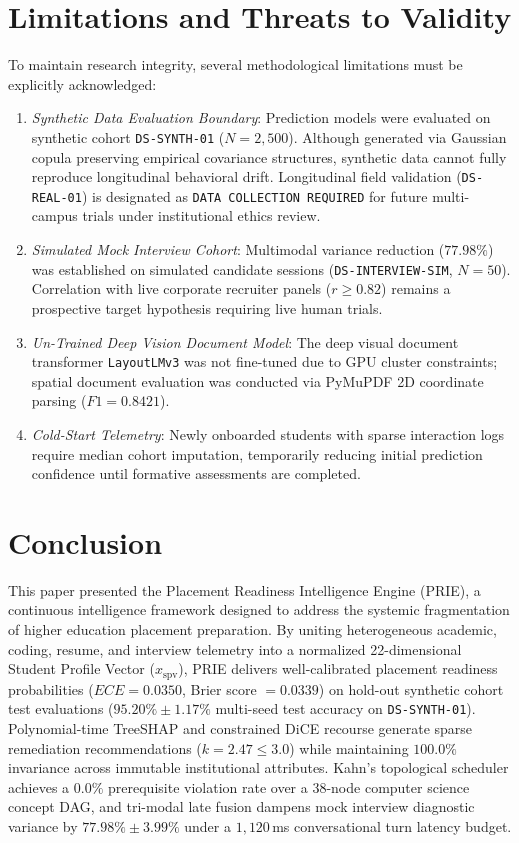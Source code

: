 \documentclass[conference]{IEEEtran}
\begin{document}
\section{Limitations and Threats to Validity}

To maintain research integrity, several methodological limitations must be explicitly acknowledged:
\begin{enumerate}
\item \textit{Synthetic Data Evaluation Boundary}: Prediction models were evaluated on synthetic cohort \texttt{DS-SYNTH-01} ($N=2,500$). Although generated via Gaussian copula preserving empirical covariance structures, synthetic data cannot fully reproduce longitudinal behavioral drift. Longitudinal field validation (\texttt{DS-REAL-01}) is designated as \texttt{DATA COLLECTION REQUIRED} for future multi-campus trials under institutional ethics review.
\item \textit{Simulated Mock Interview Cohort}: Multimodal variance reduction ($77.98\%$) was established on simulated candidate sessions (\texttt{DS-INTERVIEW-SIM}, $N=50$). Correlation with live corporate recruiter panels ($r \ge 0.82$) remains a prospective target hypothesis requiring live human trials.
\item \textit{Un-Trained Deep Vision Document Model}: The deep visual document transformer \texttt{LayoutLMv3} was not fine-tuned due to GPU cluster constraints; spatial document evaluation was conducted via PyMuPDF 2D coordinate parsing ($F1 = 0.8421$).
\item \textit{Cold-Start Telemetry}: Newly onboarded students with sparse interaction logs require median cohort imputation, temporarily reducing initial prediction confidence until formative assessments are completed.
\end{enumerate}

\section{Conclusion}

This paper presented the Placement Readiness Intelligence Engine (PRIE), a continuous intelligence framework designed to address the systemic fragmentation of higher education placement preparation. By uniting heterogeneous academic, coding, resume, and interview telemetry into a normalized 22-dimensional Student Profile Vector ($x_{\text{spv}}$), PRIE delivers well-calibrated placement readiness probabilities ($ECE = 0.0350$, Brier score $= 0.0339$) on hold-out synthetic cohort test evaluations ($95.20\% \pm 1.17\%$ multi-seed test accuracy on \texttt{DS-SYNTH-01}). Polynomial-time TreeSHAP and constrained DiCE recourse generate sparse remediation recommendations ($k = 2.47 \le 3.0$) while maintaining $100.0\%$ invariance across immutable institutional attributes. Kahn's topological scheduler achieves a $0.0\%$ prerequisite violation rate over a 38-node computer science concept DAG, and tri-modal late fusion dampens mock interview diagnostic variance by $77.98\% \pm 3.99\%$ under a $1,120$\,ms conversational turn latency budget.
\end{document}
